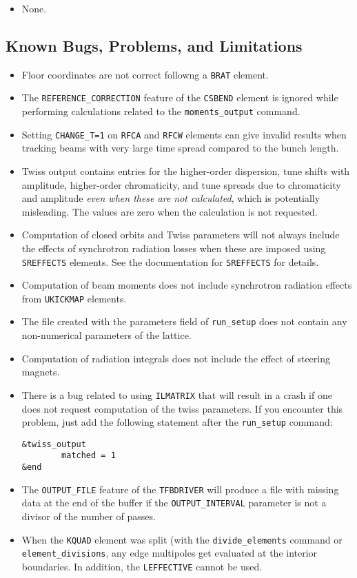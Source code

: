 \documentclass[11pt]{article}
\begin{document}
\begin{itemize}
\item None.
\end{itemize}

\subsection{Known Bugs, Problems, and Limitations}
\begin{itemize}
\item Floor coordinates are not correct followng a \verb|BRAT| element.
\item The \verb|REFERENCE_CORRECTION| feature of the \verb|CSBEND| element is ignored while performing calculations related
  to the \verb|moments_output| command.
\item Setting \verb|CHANGE_T=1| on \verb|RFCA| and \verb|RFCW| elements can give invalid results when tracking beams with very 
  large time spread compared to the bunch length.
\item Twiss output contains entries for the higher-order dispersion, tune shifts with amplitude, higher-order chromaticity, and tune spreads
  due to chromaticity and amplitude {\em even when these are not calculated}, which is potentially
  misleading.   The values are zero when the calculation is not requested.
\item Computation of closed orbits and Twiss parameters will not always include the effects of synchrotron
  radiation losses when these are imposed using {\tt SREFFECTS} elements.  See
  the documentation for {\tt SREFFECTS} for details.
\item Computation of beam moments does not include synchrotron radiation effects from \verb|UKICKMAP| elements.
\item The file created with the parameters field of \verb|run_setup| does not contain
  any non-numerical parameters of the lattice.
\item Computation of radiation integrals does not include the effect of steering magnets.
\item There is a bug related to using {\tt ILMATRIX} that will result in a crash
  if one does not request computation of the twiss parameters. If you encounter this
  problem, just add the following statement after the \verb|run_setup| command:
\begin{verbatim}
&twiss_output
        matched = 1
&end
\end{verbatim}
\item The \verb|OUTPUT_FILE| feature of the \verb|TFBDRIVER| will produce a file with missing data at the end of
  the buffer if the \verb|OUTPUT_INTERVAL| parameter is not a divisor of the number of passes.
\item When the \verb|KQUAD| element was split (with the \verb|divide_elements| command or
  \verb|element_divisions|, any edge multipoles get evaluated at the interior boundaries. In addition, the
  \verb|LEFFECTIVE| cannot be used.
\end{itemize}
\end{document}

